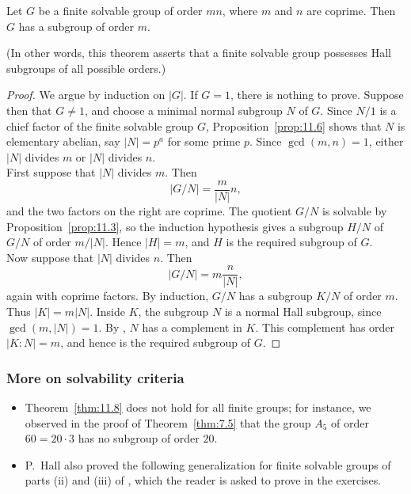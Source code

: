 \documentclass[../Odyssey_Project.tex]{subfiles}
\begin{document}
\begin{theorem}
\label{thm:11.8}
Let $G$ be a finite solvable group of order $mn$, where $m$ and $n$ are coprime. Then $G$ has a subgroup of order $m$.

(In other words, this theorem asserts that a finite solvable group possesses Hall subgroups of all possible orders.)
\end{theorem}
\begin{proof}
    We argue by induction on $\lvert G\rvert$. If $G=1$, there is nothing to prove. Suppose then that $G\neq 1$, and choose a minimal normal subgroup $N$ of $G$. Since $N/1$ is a chief factor of the finite solvable group $G$, Proposition~\ref{prop:11.6} shows that $N$ is elementary abelian, say $\lvert N\rvert=p^a$ for some prime $p$. Since $\gcd(m,n)=1$, either $\lvert N\rvert$ divides $m$ or $\lvert N\rvert$ divides $n$. \\
    First suppose that $\lvert N\rvert$ divides $m$. Then
    \[
        \lvert G/N\rvert = \frac{m}{\lvert N\rvert}n,
    \]
    and the two factors on the right are coprime. The quotient $G/N$ is solvable by Proposition~\ref{prop:11.3}, so the induction hypothesis gives a subgroup $H/N$ of $G/N$ of order $m/\lvert N\rvert$. Hence $\lvert H\rvert=m$, and $H$ is the required subgroup of $G$. \\
    Now suppose that $\lvert N\rvert$ divides $n$. Then
    \[
        \lvert G/N\rvert = m\frac{n}{\lvert N\rvert},
    \]
    again with coprime factors. By induction, $G/N$ has a subgroup $K/N$ of order $m$. Thus $\lvert K\rvert=m\lvert N\rvert$. Inside $K$, the subgroup $N$ is a normal Hall subgroup, since $\gcd(m,\lvert N\rvert)=1$. By , $N$ has a complement in $K$. This complement has order $\lvert K:N\rvert=m$, and hence is the required subgroup of $G$.
\end{proof}

\subsubsection*{More on solvability criteria}
\begin{itemize}
    \item Theorem~\ref{thm:11.8} does not hold for all finite groups; for instance, we observed in the proof of Theorem~\ref{thm:7.5} that the group $A_5$ of order $60 = 20 \cdot 3$ has no subgroup of order $20$.
    \item P.~Hall also proved the following generalization for finite solvable groups of parts (ii) and (iii) of , which the reader is asked to prove in the exercises.
\end{itemize}
\end{document}
